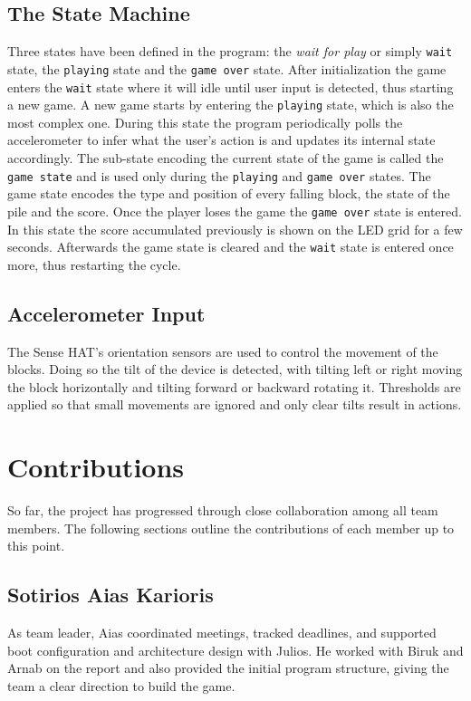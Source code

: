 \documentclass[11pt,titlepage,openright]{book}
\begin{document}
\section{The State Machine}
Three states have been defined in the program: the \textit{wait for play} or simply \texttt{wait} state, the \texttt{playing} state and the \texttt{game over} state. After initialization the game enters the \texttt{wait} state where it will idle until user input is detected, thus starting a new game. A new game starts by entering the \texttt{playing} state, which is also the most complex one. During this state the program periodically polls the accelerometer to infer what the user's action is and updates its internal state accordingly. The sub-state encoding the current state of the game is called the \texttt{game state} and is used only during the \texttt{playing} and \texttt{game over} states. The game state encodes the type and position of every falling block, the state of the pile and the score. Once the player loses the game the \texttt{game over} state is entered. In this state the score accumulated previously is shown on the LED grid for a few seconds. Afterwards the game state is cleared and the \texttt{wait} state is entered once more, thus restarting the cycle.

\section{Accelerometer Input}
The Sense HAT’s orientation sensors are used to control the movement of the blocks. Doing so the tilt of the device is detected, with tilting left or right moving the block horizontally and tilting forward or backward rotating it. Thresholds are applied so that small movements are ignored and only clear tilts result in actions.



\chapter{Contributions}
So far, the project has progressed through close collaboration among all team members. The following sections outline the contributions of each member up to this point.

\section{Sotirios Aias Karioris}
As team leader, Aias coordinated meetings, tracked deadlines, and supported boot configuration and architecture design with Julios. He worked with Biruk and Arnab on the report and also provided the initial program structure, giving the team a clear direction to build the game.
\end{document}
